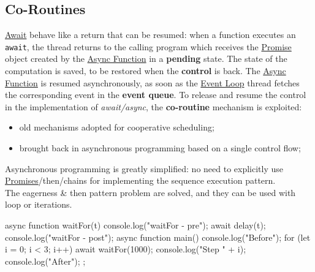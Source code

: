 \subsection{Co-Routines}\label{sub:rs_co_routines} %
\hyperref[sub:rs_await_operator]{Await} behave like a return that can be resumed: when a function executes an \texttt{await}, the thread returns to the calling program which receives the \hyperref[def:promises]{Promise} object created by the \hyperref[sub:rs_async_functions]{Async Function} in a \textbf{pending} state.
The state of the computation is saved, to be restored when the \textbf{control} is back.
The \hyperref[sub:rs_async_functions]{Async Function} is resumed asynchronously, as soon as the \hyperref[sec:rs_event_loop]{Event Loop} thread fetches the corresponding event in the \textbf{event queue}.
\emptyln{}
To release and resume the control in the implementation of \textit{await/async}, the \textbf{co-routine} mechanism is exploited:
\begin{itemize}
    \item old mechanisms adopted for cooperative scheduling;
    \item brought back in asynchronous programming based on a single control flow;
\end{itemize}
\begin{note}[Benefits]
    Asynchronous programming is greatly simplified: no need to explicitly use \hyperref[def:promises]{Promises}/then/chains for implementing the sequence execution pattern.
    \\
    The eagerness \& then pattern problem are solved, and they can be used with loop or iterations.
    \begin{codeblock}[js]{}
    async function waitFor(t){
        console.log("waitFor - pre");
        await delay(t);
        console.log("waitFor - post");
    }
    async function main(){
        console.log("Before");
        for (let i = 0; i < 3; i++){
            await waitFor(1000);
            console.log("Step " + i);
        }
        console.log("After");
    };
    \end{codeblock}
\end{note}
